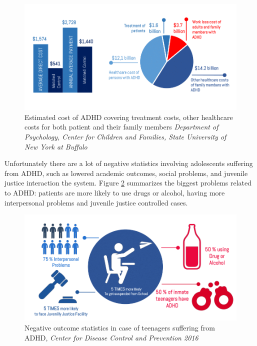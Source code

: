 \documentclass[letterpaper,10pt]{article}
\begin{document}
\vspace{4mm}
\begin{figure}[h]
\centering
\includegraphics[scale=0.3]{cost.png}
\caption[Estimated cost of ADHD]{Estimated cost of ADHD covering treatment costs, other healthcare costs for both patient and their family members \textit{Department of Psychology, Center for Children and Families, State University of New York at Buffalo}\cite{cost}}
\label{fig:adhd_cost}
\end{figure}

Unfortunately there are a lot of negative statistics involving adolescents suffering from ADHD, such as lowered academic outcomes, social problems, and juvenile justice interaction the system. Figure \ref{fig:adhdnegstat} summarizes the biggest problems related to ADHD: patients are more likely to use drugs or alcohol, having more interpersonal problems and juvenile justice controlled cases.

\vspace{4mm}
\begin{figure}[h]
\centering
\includegraphics[scale=0.3]{sideff.png}
\caption[Negative outcome statistics in case of teenagers suffering from ADHD ]{Negative outcome statistics in case of teenagers suffering from ADHD, \textit{Center for Disease Control and Prevention 2016}}
\label{fig:adhdnegstat}
\end{figure}
\end{document}
